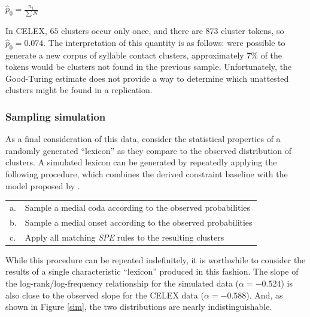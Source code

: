 \begin{unlabeledexample}
$\displaystyle \hat{p}_0 = \frac{n_1}{\displaystyle\sum N}$ 
\end{unlabeledexample}

\noindent In CELEX, $65$ clusters occur only once, and there are 873 cluster tokens, so $\hat{p}_0 = 0.074$. The interpretation of this quantity is as follows: were possible to generate a new corpus of syllable contact clusters, approximately 7\% of the tokens would be clusters not found in the previous sample. Unfortunately, the Good-Turing estimate does not provide a way to determine which unattested clusters might be found in a replication. 

\subsubsection{Sampling simulation}

As a final consideration of this data, consider the statistical properties of a randomly generated ``lexicon'' as they compare to the observed distribution of clusters. A simulated lexicon can be generated by repeatedly applying the following procedure, which combines the derived constraint baseline with the model proposed by \citet{Pierrehumbert1994}.

\begin{example}
\begin{tabular}{l l}
a. & Sample a medial coda according to the observed probabilities  \\
b. & Sample a medial onset according to the observed probabilities \\
c. & Apply all matching \emph{SPE} rules to the resulting clusters \\
\end{tabular}
\end{example}

While this procedure can be repeated indefinitely, it is worthwhile to consider the results of a single characteristic ``lexicon'' produced in this fashion. The slope of the log-rank/log-frequency relationship for the simulated data ($\alpha = -0.524$) is also close to the observed slope for the CELEX data ($\alpha = -0.588$). And, as shown in Figure \ref{sim}, the two distributions are nearly indistinguishable. 

